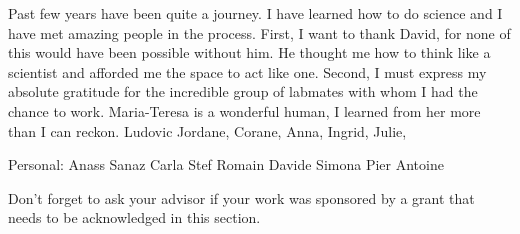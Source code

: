 Past few years have been quite a journey.
I have learned how to do science and I have met amazing people in the process.
First, I want to thank David, for none of this would have been possible without him.
He thought me how to think like a scientist and afforded me the space to act like one.
Second, I must express my absolute gratitude for the incredible group of labmates with whom I had the chance to work.
Maria-Teresa is a wonderful human, I learned from her more than I can reckon.
Ludovic
Jordane, Corane, Anna, Ingrid, Julie,

Personal:
Anass
Sanaz
Carla
Stef
Romain
Davide
Simona
Pier Antoine






Don't forget to ask your advisor if your work was sponsored by a grant that needs to be acknowledged in this section.  